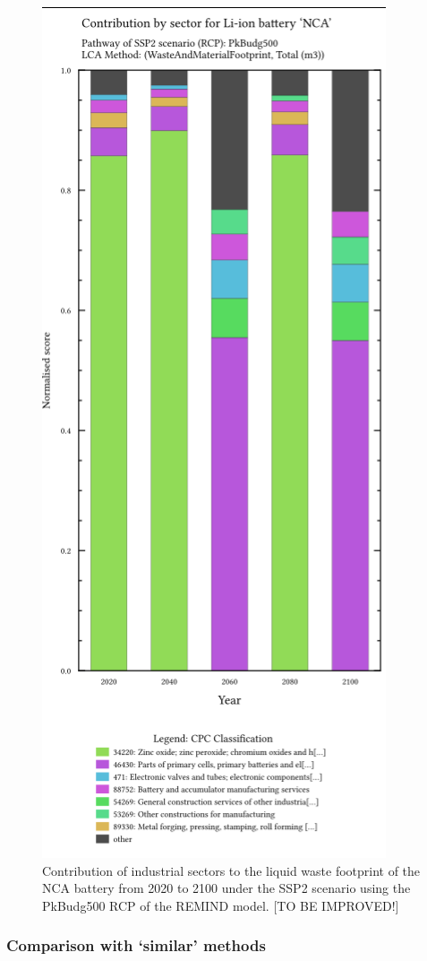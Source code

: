 \begin{figure}[H]
    \centering
    \includegraphics[width=0.6\linewidth]{figures/cpc_contribution.png
    }
    \caption{Contribution of industrial sectors to the liquid waste footprint of the NCA battery from 2020 to 2100 under the SSP2 scenario using the PkBudg500 RCP of the REMIND model. [TO BE IMPROVED!]}\label{fig:cpc_contribution}
\end{figure}


\subsubsection{Comparison with `similar' methods}\label{sec:results-case_study-methodcomparison}

